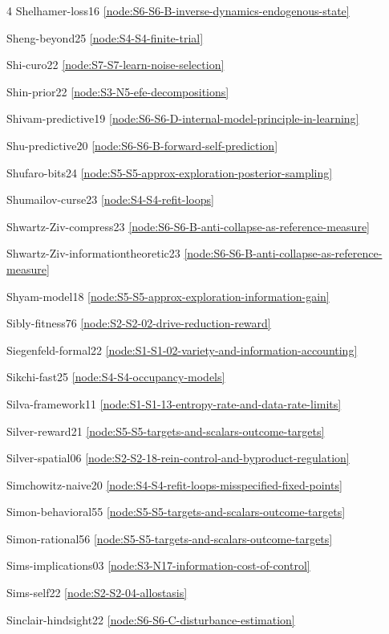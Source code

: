 \documentclass[10pt]{article}
\begin{document}
{\begin{multicols}{4}
Shelhamer-loss16 \hfill \ref{node:S6-S6-B-inverse-dynamics-endogenous-state}\par
Sheng-beyond25 \hfill \ref{node:S4-S4-finite-trial}\par
Shi-curo22 \hfill \ref{node:S7-S7-learn-noise-selection}\par
Shin-prior22 \hfill \ref{node:S3-N5-efe-decompositions}\par
Shivam-predictive19 \hfill \ref{node:S6-S6-D-internal-model-principle-in-learning}\par
Shu-predictive20 \hfill \ref{node:S6-S6-B-forward-self-prediction}\par
Shufaro-bits24 \hfill \ref{node:S5-S5-approx-exploration-posterior-sampling}\par
Shumailov-curse23 \hfill \ref{node:S4-S4-refit-loops}\par
Shwartz-Ziv-compress23 \hfill \ref{node:S6-S6-B-anti-collapse-as-reference-measure}\par
Shwartz-Ziv-informationtheoretic23 \hfill \ref{node:S6-S6-B-anti-collapse-as-reference-measure}\par
Shyam-model18 \hfill \ref{node:S5-S5-approx-exploration-information-gain}\par
Sibly-fitness76 \hfill \ref{node:S2-S2-02-drive-reduction-reward}\par
Siegenfeld-formal22 \hfill \ref{node:S1-S1-02-variety-and-information-accounting}\par
Sikchi-fast25 \hfill \ref{node:S4-S4-occupancy-models}\par
Silva-framework11 \hfill \ref{node:S1-S1-13-entropy-rate-and-data-rate-limits}\par
Silver-reward21 \hfill \ref{node:S5-S5-targets-and-scalars-outcome-targets}\par
Silver-spatial06 \hfill \ref{node:S2-S2-18-rein-control-and-byproduct-regulation}\par
Simchowitz-naive20 \hfill \ref{node:S4-S4-refit-loops-misspecified-fixed-points}\par
Simon-behavioral55 \hfill \ref{node:S5-S5-targets-and-scalars-outcome-targets}\par
Simon-rational56 \hfill \ref{node:S5-S5-targets-and-scalars-outcome-targets}\par
Sims-implications03 \hfill \ref{node:S3-N17-information-cost-of-control}\par
Sims-self22 \hfill \ref{node:S2-S2-04-allostasis}\par
Sinclair-hindsight22 \hfill \ref{node:S6-S6-C-disturbance-estimation}\par

\end{multicols}}
\end{document}
